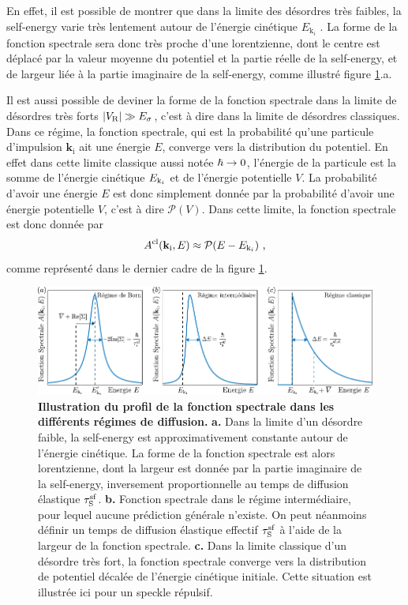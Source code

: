 En effet, il est possible de montrer que dans la limite des désordres très faibles, la self-energy varie très lentement autour de l'énergie cinétique $E_{\mathrm{k}_i}$ \citep{kuhn2007coherent}. La forme de la fonction spectrale sera donc très proche d'une lorentzienne, dont le centre est déplacé par la valeur moyenne du potentiel et la partie réelle de la self-energy, et de largeur liée à la partie imaginaire de la self-energy, comme illustré figure \ref{fig:illustration_fonction_spectrale_diffusion}.a. 


Il est aussi possible de deviner la forme de la fonction spectrale dans la limite de désordres très forts $|V_{\mathrm{R}}|\gg E_{\sigma}$, c'est à dire dans la limite de désordres classiques. Dans ce régime, la fonction spectrale, qui est la probabilité qu'une particule d'impulsion $\mathbf{k}_{\mathrm{i}}$ ait une énergie $E$, converge vers la distribution du potentiel. En effet dans cette limite classique aussi notée $\hslash\rightarrow 0$, l'énergie de la particule est la somme de l'énergie cinétique $E_{\mathrm{k}_i}$ et de l'énergie potentielle $V$. La probabilité d'avoir une énergie $E$ est donc simplement donnée par la probabilité d'avoir une énergie potentielle $V$, c'est à dire $\mathcal{P}(V)$. Dans cette limite, la fonction spectrale est donc donnée par \citep{trappe2015semiclassical}
\begin{equation}
A^{\mathrm{cl}}(\mathbf{k}_{\mathrm{i}},E)\approx \mathcal{P}(E-E_{\mathrm{k}_i}) \text{ ,}
\end{equation}
comme représenté dans le dernier cadre de la figure \ref{fig:illustration_fonction_spectrale_diffusion}.


\begin{figure}
\centering
\includegraphics[width=\textwidth]{Fig/TauS_NJP/illustration_fonction_spectrale_diffusion.pdf}
\caption{\textbf{Illustration du profil de la fonction spectrale dans les différents régimes de diffusion.} \textbf{a.} Dans la limite d'un désordre faible, la self-energy est approximativement constante autour de l'énergie cinétique. La forme de la fonction spectrale est alors lorentzienne, dont la largeur est donnée par la partie imaginaire de la self-energy, inversement proportionnelle au temps de diffusion élastique $\tau_{\mathrm{S}}^{\mathrm{sf}}$. \textbf{b.} Fonction spectrale dans le régime intermédiaire, pour lequel aucune prédiction générale n'existe. On peut néanmoins définir un temps de diffusion élastique effectif $\tau_{\mathrm{S}}^{\mathrm{sf}}$ à l'aide de la largeur de la fonction spectrale. \textbf{c.} Dans la limite classique d'un désordre très fort, la fonction spectrale converge vers la distribution de potentiel décalée de l'énergie cinétique initiale. Cette situation est illustrée ici pour un speckle répulsif.}
\label{fig:illustration_fonction_spectrale_diffusion}
\end{figure}


